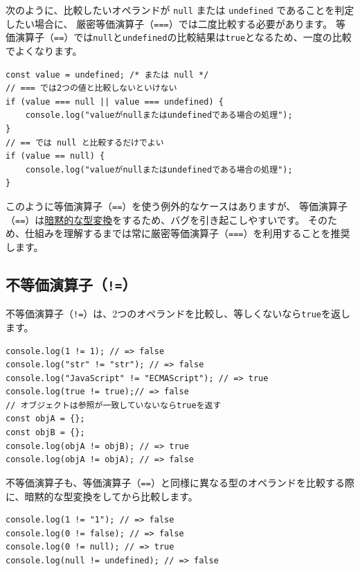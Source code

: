 次のように、比較したいオペランドが \texttt{null} または
\texttt{undefined} であることを判定したい場合に、
厳密等価演算子（\texttt{===}）では二度比較する必要があります。
等価演算子（\texttt{==}）では\texttt{null}と\texttt{undefined}の比較結果は\texttt{true}となるため、一度の比較でよくなります。

\begin{lstlisting}
const value = undefined; /* または null */
// === では2つの値と比較しないといけない
if (value === null || value === undefined) {
    console.log("valueがnullまたはundefinedである場合の処理");
}
// == では null と比較するだけでよい
if (value == null) {
    console.log("valueがnullまたはundefinedである場合の処理");
}
\end{lstlisting}

このように等価演算子（\texttt{==}）を使う例外的なケースはありますが、
等価演算子（\texttt{==}）は\hyperlink{implicit-coercion}{暗黙的な型変換}をするため、バグを引き起こしやすいです。
そのため、仕組みを理解するまでは常に厳密等価演算子（\texttt{===}）を利用することを推奨します。

\hypertarget{not-equal-operator}{%
\subsection{\texorpdfstring{不等価演算子（\texttt{!=}）}{不等価演算子（!=）}}\label{not-equal-operator}}

不等価演算子（\texttt{!=}）は、2つのオペランドを比較し、等しくないなら\texttt{true}を返します。

\begin{lstlisting}
console.log(1 != 1); // => false
console.log("str" != "str"); // => false
console.log("JavaScript" != "ECMAScript"); // => true
console.log(true != true);// => false
// オブジェクトは参照が一致していないならtrueを返す
const objA = {};
const objB = {};
console.log(objA != objB); // => true
console.log(objA != objA); // => false
\end{lstlisting}

不等価演算子も、等価演算子（\texttt{==}）と同様に異なる型のオペランドを比較する際に、暗黙的な型変換をしてから比較します。

\begin{lstlisting}
console.log(1 != "1"); // => false
console.log(0 != false); // => false
console.log(0 != null); // => true
console.log(null != undefined); // => false
\end{lstlisting}

